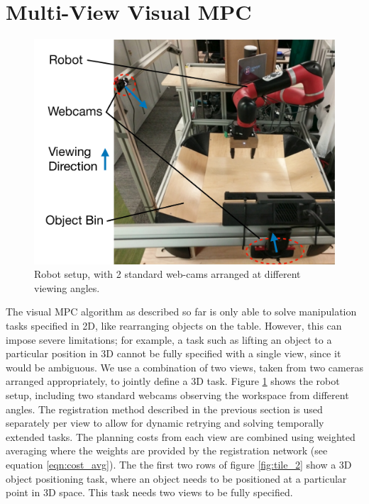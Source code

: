 \section{Multi-View Visual MPC}
\label{sec:multiview}
\begin{figure}
	\centering
	\includegraphics[width=0.45\columnwidth]{images_general/robot_setup_scheme.pdf}
	\caption{\small{Robot setup, with 2 standard web-cams arranged at different viewing angles.}}	\label{fig:robot_setup}
\end{figure}

The visual MPC algorithm as described so far is only able to solve manipulation tasks specified in 2D, like rearranging objects on the table. However, this can impose severe limitations; for example, a task such as lifting an object to a particular position in 3D cannot be fully specified with a single view, since it would be ambiguous. 
We use a combination of two views, taken from two cameras arranged appropriately, to jointly define a 3D task. Figure \ref{fig:robot_setup} shows the robot setup, including two standard webcams observing the workspace from different angles. The registration method described in the previous section is used separately per view to allow for dynamic retrying and solving temporally extended tasks. The planning costs from each view are combined using weighted averaging where the weights are provided by the registration network (see equation \ref{eqn:cost_avg}). The the first two rows of figure \ref{fig:tile_2} show a 3D object positioning task, where an object needs to be positioned at a particular point in 3D space. This task needs two views to be fully specified.





